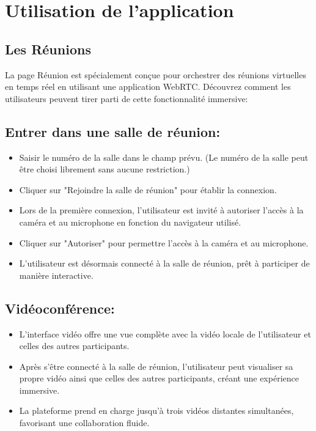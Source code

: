 \documentclass[12pt, a4paper, oneside]{thesis}
\begin{document}
\newpage

\section{Utilisation de l'application}

\subsection{Les Réunions}

La page Réunion est spécialement conçue pour orchestrer des réunions virtuelles en temps réel en utilisant une application WebRTC. Découvrez comment les utilisateurs peuvent tirer parti de cette fonctionnalité immersive:

\subsection*{Entrer dans une salle de réunion:}
\begin{itemize}
  \item Saisir le numéro de la salle dans le champ prévu. (Le numéro de la salle peut être choisi librement sans aucune restriction.)
  \item Cliquer sur "Rejoindre la salle de réunion" pour établir la connexion.
  \item Lors de la première connexion, l'utilisateur est invité à autoriser l'accès à la caméra et au microphone en fonction du navigateur utilisé.
  \item Cliquer sur "Autoriser" pour permettre l'accès à la caméra et au microphone.
  \item L'utilisateur est désormais connecté à la salle de réunion, prêt à participer de manière interactive.
\end{itemize}

\subsection*{Vidéoconférence:}
\begin{itemize}
  \item L'interface vidéo offre une vue complète avec la vidéo locale de l'utilisateur et celles des autres participants.
  \item Après s'être connecté à la salle de réunion, l'utilisateur peut visualiser sa propre vidéo ainsi que celles des autres participants, créant une expérience immersive.
  \item La plateforme prend en charge jusqu'à trois vidéos distantes simultanées, favorisant une collaboration fluide.
\end{itemize}
\end{document}
